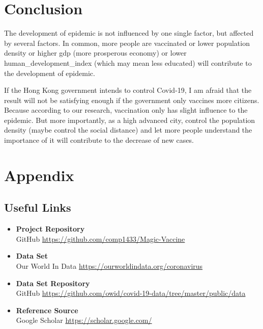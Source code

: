 \documentclass{article}
\begin{document}
\begin{multicols}{2}
\section{Conclusion}

The development of epidemic is not influenced by one single factor, but affected by several factors. In common, more people are vaccinated or lower population density or higher gdp (more prosperous economy) or lower human\_development\_index (which may mean less educated) will contribute to the development of epidemic.

If the Hong Kong government intends to control Covid-19, I am afraid that the result will not be satisfying enough if the government only vaccines more citizens. Because according to our research, vaccination only has slight influence to the epidemic. But more importantly, as a high advanced city, control the population density (maybe control the social distance) and let more people understand the importance of it will contribute to the decrease of new cases.

\section{Appendix}
\subsection{Useful Links}
\begin{itemize}
    \item \textbf{Project Repository} \\GitHub \url{https://github.com/comp1433/Magic-Vaccine}
    \item \textbf{Data Set} \\Our World In Data \url{https://ourworldindata.org/coronavirus}
    \item \textbf{Data Set Repository} \\GitHub \url{https://github.com/owid/covid-19-data/tree/master/public/data}
    \item \textbf{Reference Source} \\Google Scholar \url{https://scholar.google.com/}
\end{itemize}
  
  

\end{multicols}
\end{document}
